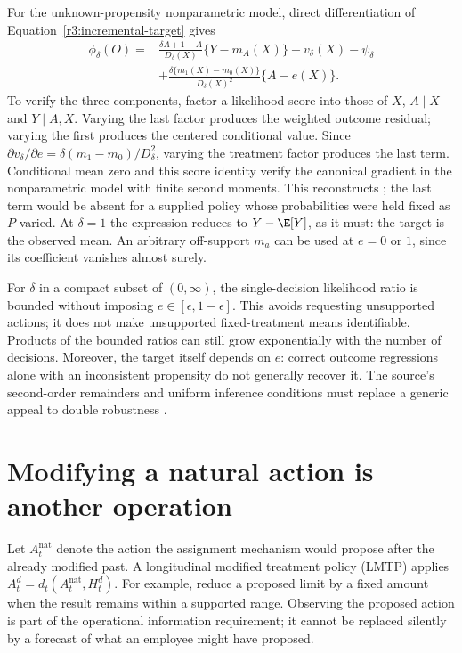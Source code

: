 For the unknown-propensity nonparametric model, direct differentiation
of Equation~\eqref{r3:incremental-target} gives
\begin{equation}
 \begin{split}
 \phi_\delta(O)={}&
 \frac{\delta A+1-A}{D_\delta(X)}\{Y-m_A(X)\}
       +v_\delta(X)-\psi_\delta\\
 &+\frac{\delta\{m_1(X)-m_0(X)\}}{D_\delta(X)^2}\{A-e(X)\}.
 \end{split}
 \label{r3:incremental-gradient}
\end{equation}
To verify the three components, factor a likelihood score into those
of $X$, $A\mid X$ and $Y\mid A,X$. Varying the last factor produces
the weighted outcome residual; varying the first produces the centered
conditional value. Since
$\partial v_\delta/\partial e=\delta(m_1-m_0)/D_\delta^2$,
varying the treatment factor produces the last term. Conditional mean
zero and this score identity verify the canonical gradient in the
nonparametric model with finite second moments. This reconstructs
\citet[Corollary 2]{kennedy2019}; the last term would be absent for
a supplied policy whose probabilities were held fixed as $P$ varied.
At $\delta=1$ the expression reduces to $Y-\E[Y]$, as it must:
the target is the observed mean. An arbitrary off-support $m_a$ can
be used at $e=0$ or $1$, since its coefficient vanishes almost surely.

For $\delta$ in a compact subset of $(0,\infty)$, the single-decision
likelihood ratio is bounded without imposing $e\in[\epsilon,1-\epsilon]$.
This avoids requesting unsupported actions; it does not make unsupported
fixed-treatment means identifiable. Products of the bounded ratios
can still grow exponentially with the number of decisions. Moreover,
the target itself depends on $e$: correct outcome regressions alone
with an inconsistent propensity do not generally recover it. The
source's second-order remainders and uniform inference conditions
must replace a generic appeal to double robustness
\citep[Sections 4.3--4.4 and Theorems 3--4]{kennedy2019}.

\section{Modifying a natural action is another operation}
\label{r3:modified-policy}
Let $A_t^{\mathrm{nat}}$ denote the action the assignment mechanism
would propose after the already modified past. A longitudinal modified
treatment policy (LMTP) applies
$A_t^d=d_t(A_t^{\mathrm{nat}},H_t^d)$. For example, reduce a proposed
limit by a fixed amount when the result remains within a supported
range. Observing the proposed action is part of the operational
information requirement; it cannot be replaced silently by a forecast
of what an employee might have proposed.

